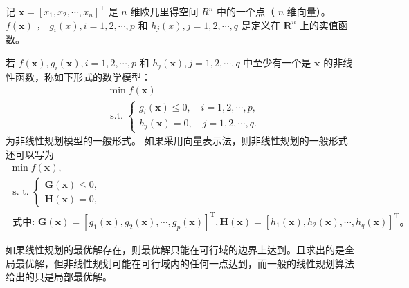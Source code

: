 \begin{definition}[非线性规划的数学模型]
    记 $\boldsymbol{x}=\left[x_1, x_2, \cdots, x_n\right]^{\mathrm{T}}$ 是 $n$ 维欧几里得空间 $R^n$ 中的一个点（ $n$ 维向量）。 $f(\boldsymbol{x})$ ， $g_i(x), i=1,2, \cdots, p$ 和 $h_j(x), j=1,2, \cdots, q$ 是定义在 $\mathbf{R}^n$ 上的实值函数。

    若 $f(\boldsymbol{x}), g_i(\boldsymbol{x}), i=1,2, \cdots, p$ 和 $h_j(\boldsymbol{x}), j=1,2, \cdots, q$ 中至少有一个是 $\boldsymbol{x}$ 的非线性函数，称如下形式的数学模型：
    $$
        \begin{aligned}
             & \min f(\boldsymbol{x})                                                        \\
             & \text { s.t. }\left\{\begin{array}{l}
                                        g_i(\boldsymbol{x}) \leqslant 0, \quad i=1,2, \cdots, p, \\
                                        h_j(\boldsymbol{x})=0, \quad j=1,2, \cdots, q .
                                    \end{array}\right.
        \end{aligned}
    $$
    为非线性规划模型的一般形式。
    如果采用向量表示法，则非线性规划的一般形式还可以写为
    $$
        \begin{gathered}
            \min f(\boldsymbol{x}), \\
            \text { s. t. }\left\{\begin{array}{l}
                \boldsymbol{G}(\boldsymbol{x}) \leqslant 0, \\
                \boldsymbol{H}(\boldsymbol{x})=0,
            \end{array}\right. \\
            \text { 式中: } \boldsymbol{G}(\boldsymbol{x})=\left[g_1(\boldsymbol{x}), g_2(\boldsymbol{x}), \cdots, g_p(\boldsymbol{x})\right]^{\mathrm{T}}, \boldsymbol{H}(\boldsymbol{x})=\left[h_1(\boldsymbol{x}), h_2(\boldsymbol{x}), \cdots, h_q(\boldsymbol{x})\right]^{\mathrm{T}} 。
        \end{gathered}
    $$
\end{definition}

\begin{tips}
    如果线性规划的最优解存在，则最优解只能在可行域的边界上达到。且求出的是全局最优解，但非线性规划可能在可行域内的任何一点达到，而一般的线性规划算法给出的只是局部最优解。
\end{tips}

